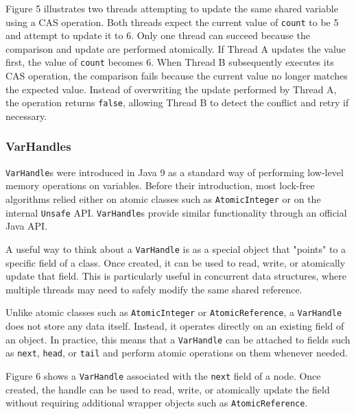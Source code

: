 
Figure 5 illustrates two threads attempting to update the same shared variable using a CAS operation. Both threads expect the current value of \texttt{count} to be 5 and attempt to update it to 6. Only one thread can succeed because the comparison and update are performed atomically. If Thread A updates the value first, the value of \texttt{count} becomes 6. When Thread B subsequently executes its CAS operation, the comparison fails because the current value no longer matches the expected value. Instead of overwriting the update performed by Thread A, the operation returns \texttt{false}, allowing Thread B to detect the conflict and retry if necessary.


\subsubsection{VarHandles}
\texttt{VarHandle}s were introduced in Java 9 as a standard way of performing low-level memory operations on variables. Before their introduction, most lock-free algorithms relied either on atomic classes such as \texttt{AtomicInteger} or on the internal \texttt{Unsafe} API. \texttt{VarHandle}s provide similar functionality through an official Java API. \cite{jep193-varhandles}

A useful way to think about a \texttt{VarHandle} is as a special object that "points" to a specific field of a class. Once created, it can be used to read, write, or atomically update that field. This is particularly useful in concurrent data structures, where multiple threads may need to safely modify the same shared reference. \cite{jep193-varhandles}

Unlike atomic classes such as \texttt{AtomicInteger} or \texttt{AtomicReference}, a \texttt{VarHandle} does not store any data itself. Instead, it operates directly on an existing field of an object. In practice, this means that a \texttt{VarHandle} can be attached to fields such as \texttt{next}, \texttt{head}, or \texttt{tail} and perform atomic operations on them whenever needed. \cite{jep193-varhandles}



Figure 6 shows a \texttt{VarHandle} associated with the \texttt{next} field of a node. Once created, the handle can be used to read, write, or atomically update the field without requiring additional wrapper objects such as \texttt{AtomicReference}.

